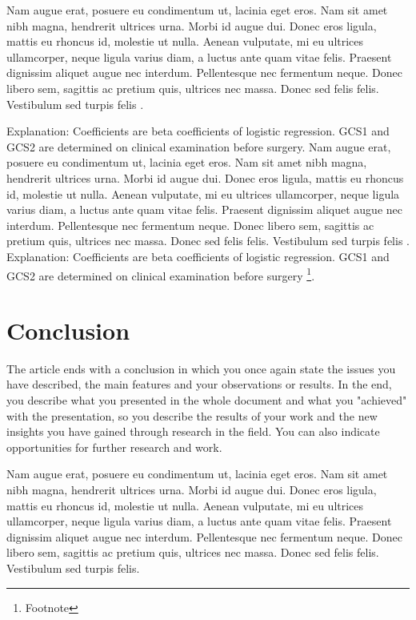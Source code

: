 \documentclass{comjnl}
\begin{document}
Nam augue erat, posuere eu condimentum ut, lacinia eget eros. Nam sit amet nibh magna, hendrerit ultrices urna. Morbi id augue dui. Donec eros ligula, mattis eu rhoncus id, molestie ut nulla. Aenean vulputate, mi eu ultrices ullamcorper, neque ligula varius diam, a luctus ante quam vitae felis. Praesent dignissim aliquet augue nec interdum. Pellentesque nec fermentum neque. Donec libero sem, sagittis ac pretium quis, ultrices nec massa. Donec sed felis felis. Vestibulum sed turpis felis \cite{ZZPPZ}.

Explanation: Coefficients are beta coefficients of logistic regression. GCS1 and GCS2 are determined on clinical examination before surgery. Nam augue erat, posuere eu condimentum ut, lacinia eget eros. Nam sit amet nibh magna, hendrerit ultrices urna. Morbi id augue dui. Donec eros ligula, mattis eu rhoncus id, molestie ut nulla. Aenean vulputate, mi eu ultrices ullamcorper, neque ligula varius diam, a luctus ante quam vitae felis. Praesent dignissim aliquet augue nec interdum. Pellentesque nec fermentum neque. Donec libero sem, sagittis ac pretium quis, ultrices nec massa. Donec sed felis felis. Vestibulum sed turpis felis \cite{iib}.
Explanation: Coefficients are beta coefficients of logistic regression. GCS1 and GCS2 are determined on clinical examination before surgery \footnote{Footnote}.




\section{Conclusion} 
\label{Conclusions}
The article ends with a conclusion in which you once again state the issues you have described, the main features and your observations or results. In the end, you describe what you presented in the whole document and what you "achieved" with the presentation, so you describe the results of your work and the new insights you have gained through research in the field. You can also indicate opportunities for further research and work.

Nam augue erat, posuere eu condimentum ut, lacinia eget eros. Nam sit amet nibh magna, hendrerit ultrices urna. Morbi id augue dui. Donec eros ligula, mattis eu rhoncus id, molestie ut nulla. Aenean vulputate, mi eu ultrices ullamcorper, neque ligula varius diam, a luctus ante quam vitae felis. Praesent dignissim aliquet augue nec interdum. Pellentesque nec fermentum neque. Donec libero sem, sagittis ac pretium quis, ultrices nec massa. Donec sed felis felis. Vestibulum sed turpis felis.
\end{document}

